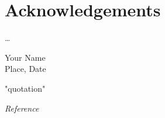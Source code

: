 \chapter{Acknowledgements}
\ldots
\vspace*{\fill}
\begin {flushright}
Your Name\\
Place, Date
\end{flushright}
\clearpage

\vspace*{\fill}
\epigraph{"quotation"}{\textit{Reference}}
